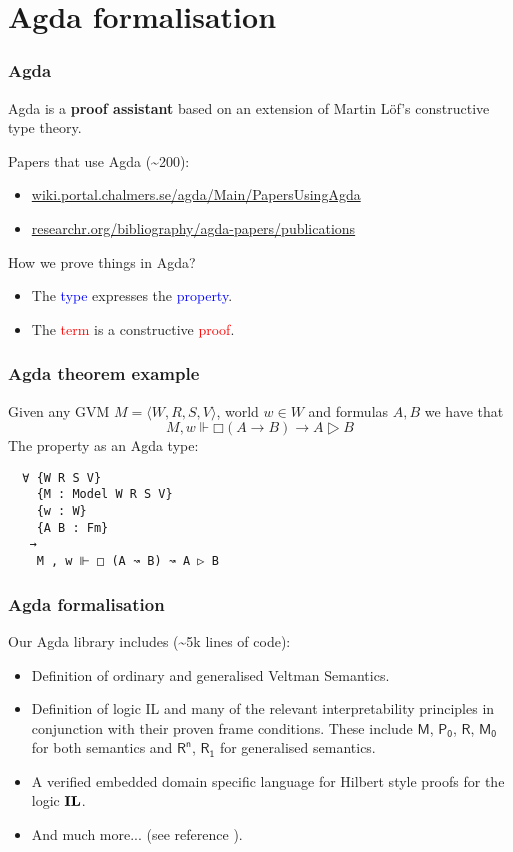 \documentclass[xcolor={x11names}]{beamer}
\newcommand{\prin}[1]{\ensuremath{\textbf{\textup{#1}}}\xspace}
\newcommand{\il}{\prin{IL}}
\newcommand{\principle}[1]{\text{$\mathsf{#1}$}}
\begin{document}
\section{Agda formalisation}
\begin{frame}[fragile]
  \frametitle{Agda}
  Agda is a \textbf{proof assistant} based on an extension of Martin Löf's constructive
  type theory.

  \vspace{0.3cm}
  \pause
  Papers that use Agda (\textasciitilde 200):

  \begin{itemize}
  \item \href{https://wiki.portal.chalmers.se/agda/Main/PapersUsingAgda}{wiki.portal.chalmers.se/agda/Main/PapersUsingAgda}

  \item \href{https://researchr.org/bibliography/agda-papers/publications}{researchr.org/bibliography/agda-papers/publications}
  \end{itemize}

  \pause

  \vspace{0.3cm}
  How we prove things in Agda?
  \begin{itemize}
  \item The \textcolor{blue}{type} expresses the \textcolor{blue}{property}.
  \item The \textcolor{red}{term} is a constructive \textcolor{red}{proof}.
  \end{itemize}

\end{frame}

\begin{frame}[fragile]
  \frametitle{Agda theorem example}
  Given any GVM $M=⟨W,R,S,V⟩$, world $w∈W$ and formulas $A,B$ we have that
  \[M,w⊩□ (A → B) → A ▷ B\]
  \pause
  The property as an Agda type:
\begin{verbatim}
  ∀ {W R S V}
    {M : Model W R S V}
    {w : W}
    {A B : Fm}
   →
    M , w ⊩ □ (A ↝ B) ↝ A ▷ B
\end{verbatim}
\end{frame}

\begin{frame}
  \frametitle{Agda formalisation}
  Our Agda library includes (\textasciitilde 5k lines of code):
  \begin{itemize}
  \item Definition of ordinary and generalised Veltman Semantics.
  \item Definition of logic IL and many of the relevant interpretability
    principles in conjunction with their proven frame conditions. These include
    $\principle{M}$, $\principle{P_0}$, $\principle{R}$, $\principle{M_0}$ for
    both semantics and $\principle{R^n}$, $\principle{R_1}$ for generalised
    semantics.
  \item A verified embedded domain specific language for Hilbert style proofs
    for the logic \il.
  \item And much more... (see reference \cite{MasRovira:2020:MastersThesis}).
  \end{itemize}
\end{frame}
\end{document}
